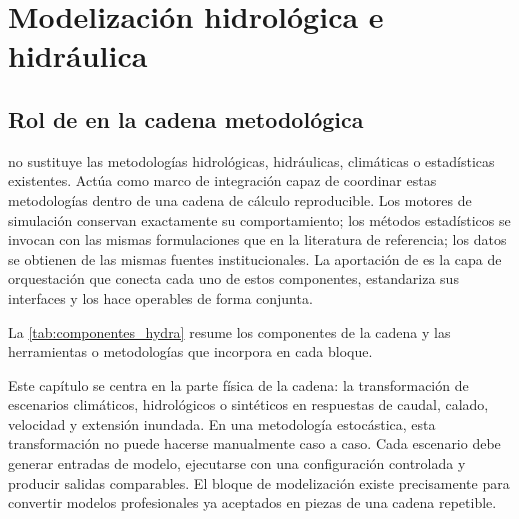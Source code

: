 \chapter{Modelización hidrológica e hidráulica}
\label{ch:modelizacion}

\section{Rol de \hydra en la cadena metodológica}
\label{sec:rol_hydra}

\hydra no sustituye las metodologías hidrológicas, hidráulicas, climáticas o estadísticas existentes. Actúa como marco de integración capaz de coordinar estas metodologías dentro de una cadena de cálculo reproducible. Los motores de simulación conservan exactamente su comportamiento; los métodos estadísticos se invocan con las mismas formulaciones que en la literatura de referencia; los datos se obtienen de las mismas fuentes institucionales. La aportación de \hydra es la capa de orquestación que conecta cada uno de estos componentes, estandariza sus interfaces y los hace operables de forma conjunta.

La \cref{tab:componentes_hydra} resume los componentes de la cadena y las herramientas o metodologías que \hydra incorpora en cada bloque.

Este capítulo se centra en la parte física de la cadena: la transformación de escenarios climáticos, hidrológicos o sintéticos en respuestas de caudal, calado, velocidad y extensión inundada. En una metodología estocástica, esta transformación no puede hacerse manualmente caso a caso. Cada escenario debe generar entradas de modelo, ejecutarse con una configuración controlada y producir salidas comparables. El bloque de modelización existe precisamente para convertir modelos profesionales ya aceptados en piezas de una cadena repetible.

